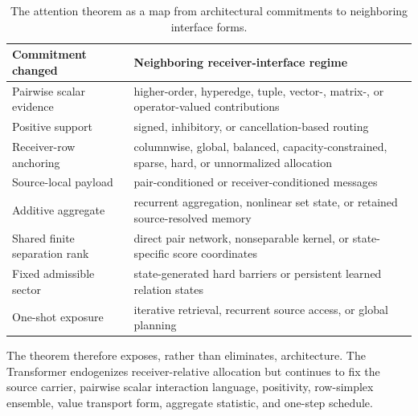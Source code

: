 \begin{table}[t]
\centering
\small
\begin{tabularx}{\textwidth}{@{}lX@{}}
\toprule
Commitment changed & Neighboring receiver-interface regime \\
\midrule
Pairwise scalar evidence & higher-order, hyperedge, tuple, vector-, matrix-, or operator-valued contributions \\
Positive support & signed, inhibitory, or cancellation-based routing \\
Receiver-row anchoring & columnwise, global, balanced, capacity-constrained, sparse, hard, or unnormalized allocation \\
Source-local payload & pair-conditioned or receiver-conditioned messages \\
Additive aggregate & recurrent aggregation, nonlinear set state, or retained source-resolved memory \\
Shared finite separation rank & direct pair network, nonseparable kernel, or state-specific score coordinates \\
Fixed admissible sector & state-generated hard barriers or persistent learned relation states \\
One-shot exposure & iterative retrieval, recurrent source access, or global planning \\
\bottomrule
\end{tabularx}
\caption{The attention theorem as a map from architectural commitments to neighboring interface forms.}
\label{tab:attention-ablation}
\end{table}

The theorem therefore exposes, rather than eliminates, architecture. The Transformer endogenizes receiver-relative allocation but continues to fix the source carrier, pairwise scalar interaction language, positivity, row-simplex ensemble, value transport form, aggregate statistic, and one-step schedule.